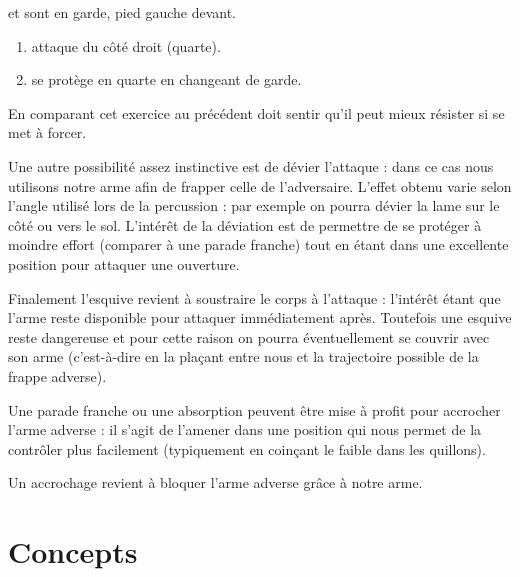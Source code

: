 \begin{exercice}

\A et \D sont en garde, pied gauche devant.

\begin{enumerate}
	\item \A attaque \D du côté droit (quarte).
	
	\item \D se protège en quarte en changeant de garde.
\end{enumerate}

En comparant cet exercice au précédent \D doit sentir qu'il peut mieux résister si \A se met à forcer.
\end{exercice}


Une autre possibilité assez instinctive est de dévier l'attaque : dans ce cas nous utilisons notre arme afin de frapper celle de l'adversaire.
L'effet obtenu varie selon l'angle utilisé lors de la percussion : par exemple on pourra dévier la lame sur le côté ou vers le sol.
L'intérêt de la déviation est de permettre de se protéger à moindre effort (comparer à une parade franche) tout en étant dans une excellente position pour attaquer une ouverture.


Finalement l'esquive revient à soustraire le corps à l'attaque : l'intérêt étant que l'arme reste disponible pour attaquer immédiatement après.
Toutefois une esquive reste dangereuse et pour cette raison on pourra éventuellement se couvrir avec son arme (c'est-à-dire en la plaçant entre nous et la trajectoire possible de la frappe adverse).


Une parade franche ou une absorption peuvent être mise à profit pour accrocher l'arme adverse : il s'agit de l'amener dans une position qui nous permet de la contrôler plus facilement (typiquement en coinçant le faible dans les quillons).


\begin{definition}[Accrochage]

Un accrochage revient à bloquer l'arme adverse grâce à notre arme.
\end{definition}


\section{Concepts}




